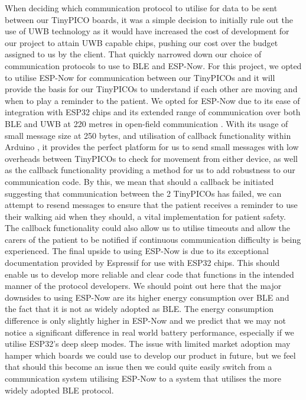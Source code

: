 {When deciding which communication protocol to utilise for data to be sent between our TinyPICO boards, it was a simple decision to initially rule out the use of UWB technology as it would have increased the cost of development for our project to attain UWB capable chips, pushing our cost over the budget assigned to us by the client. That quickly narrowed down our choice of communication protocols to use to BLE and ESP-Now. For this project, we opted to utilise ESP-Now for communication between our TinyPICOs and it will provide the basis for our TinyPICOs to understand if each other are moving and when to play a reminder to the patient. We opted for ESP-Now due to its ease of integration with ESP32 chips and its extended range of communication over both BLE and UWB at 220 metres in open-field communication \cite{random_nerd_tutorials}. With its usage of small message size at 250 bytes, and utilisation of callback functionality within Arduino \cite{random_nerd_tutorials}, it provides the perfect platform for us to send small messages with low overheads between TinyPICOs to check for movement from either device, as well as the callback functionality providing a method for us to add robustness to our communication code. By this, we mean that should a callback be initiated suggesting that communication between the 2 TinyPICOs has failed, we can attempt to resend messages to ensure that the patient receives a reminder to use their walking aid when they should, a vital implementation for patient safety. The callback functionality could also allow us to utilise timeouts and allow the carers of the patient to be notified if continuous communication difficulty is being experienced. The final upside to using ESP-Now is due to its exceptional documentation provided by Espressif for use with ESP32 chips. This should enable us to develop more reliable and clear code that functions in the intended manner of the protocol developers. We should point out here that the major downsides to using ESP-Now are its higher energy consumption over BLE \cite{neupane_2019} and the fact that it is not as widely adopted as BLE. The energy consumption difference is only slightly higher in ESP-Now and we predict that we may not notice a significant difference in real world battery performance, especially if we utilise ESP32's deep sleep modes. The issue with limited market adoption may hamper which boards we could use to develop our product in future, but we feel that should this become an issue then we could quite easily switch from a communication system utilising ESP-Now to a system that utilises the more widely adopted BLE protocol.

}
